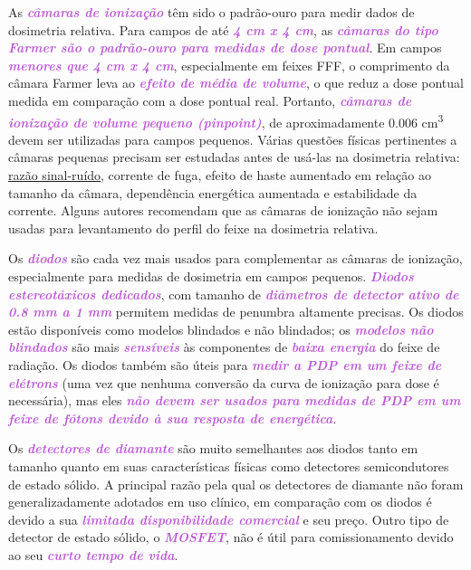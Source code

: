 \documentclass[11pt,a4paper]{article}
\begin{document}
	As \textcolor{MediumOrchid}{\textbf{\textit{câmaras de ionização}}} têm sido o padrão-ouro para medir dados de dosimetria relativa. Para campos de até \textcolor{MediumOrchid}{\textbf{\textit{4 cm x 4 cm}}}, as \textcolor{MediumOrchid}{\textbf{\textit{câmaras do tipo Farmer são o padrão-ouro para medidas de dose pontual}}}. Em campos \textcolor{MediumOrchid}{\textbf{\textit{menores que 4 cm x 4 cm}}}, especialmente em feixes FFF, o comprimento da câmara Farmer leva ao \textcolor{MediumOrchid}{\textbf{\textit{efeito de média de volume}}}, o que reduz a dose pontual medida em comparação com a dose pontual real. Portanto, \textcolor{MediumOrchid}{\textbf{\textit{câmaras de ionização de volume pequeno (pinpoint)}}}, de aproximadamente 0.006 \unit{cm^3} devem ser utilizadas para campos pequenos. Várias questões físicas pertinentes a câmaras pequenas precisam ser estudadas antes de usá-las na dosimetria relativa: \hyperref[exp:razaoSinalRuido]{razão sinal-ruído}, corrente de fuga, efeito de haste aumentado em relação ao tamanho da câmara, dependência energética aumentada e estabilidade da corrente. Alguns autores recomendam que as câmaras de ionização não sejam usadas para levantamento do perfil do feixe na dosimetria relativa.

	Os \textcolor{MediumOrchid}{\textbf{\textit{diodos}}} são cada vez mais usados para complementar as câmaras de ionização, especialmente para medidas de dosimetria em campos pequenos. \textcolor{MediumOrchid}{\textbf{\textit{Diodos estereotáxicos dedicados}}}, com tamanho de \textcolor{MediumOrchid}{\textbf{\textit{diâmetros de detector ativo de 0.8 mm a 1 mm}}} permitem medidas de penumbra altamente precisas. Os diodos estão disponíveis como modelos blindados e não blindados; os \textcolor{MediumOrchid}{\textbf{\textit{modelos não blindados}}} são mais \textcolor{MediumOrchid}{\textbf{\textit{sensíveis}}} às componentes de \textcolor{MediumOrchid}{\textbf{\textit{baixa energia}}} do feixe de radiação. Os diodos também são úteis para \textcolor{MediumOrchid}{\textbf{\textit{medir a PDP em um feixe de elétrons}}} (uma vez que nenhuma conversão da curva de ionização para dose é necessária), mas eles \textcolor{MediumOrchid}{\textbf{\textit{não devem ser usados para medidas de PDP em um feixe de fótons devido à sua resposta de energética}}}. 
	
	Os \textcolor{MediumOrchid}{\textbf{\textit{detectores de diamante}}} são muito semelhantes aos diodos tanto em tamanho quanto em suas características físicas como detectores semicondutores de estado sólido. A principal razão pela qual os detectores de diamante não foram generalizadamente adotados em uso clínico, em comparação com os diodos é devido a sua \textcolor{MediumOrchid}{\textbf{\textit{limitada disponibilidade comercial}}} e seu preço. Outro tipo de detector de estado sólido, o \textcolor{MediumOrchid}{\textbf{\textit{MOSFET}}}, não é útil para comissionamento devido ao seu \textcolor{MediumOrchid}{\textbf{\textit{curto tempo de vida}}}.
\end{document}
